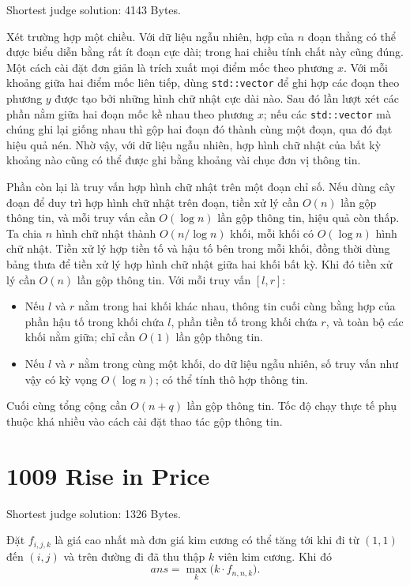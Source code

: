 \documentclass[11pt]{article}
\begin{document}
Shortest judge solution: 4143 Bytes.

Xét trường hợp một chiều. Với dữ liệu ngẫu nhiên, hợp của $n$ đoạn thẳng có
thể được biểu diễn bằng rất ít đoạn cực dài; trong hai chiều tính chất này
cũng đúng. Một cách cài đặt đơn giản là trích xuất mọi điểm mốc theo phương
$x$. Với mỗi khoảng giữa hai điểm mốc liên tiếp, dùng \texttt{std::vector}
để ghi hợp các đoạn theo phương $y$ được tạo bởi những hình chữ nhật cực dài
nào. Sau đó lần lượt xét các phần nằm giữa hai đoạn mốc kề nhau theo phương
$x$; nếu các \texttt{std::vector} mà chúng ghi lại giống nhau thì gộp hai
đoạn đó thành cùng một đoạn, qua đó đạt hiệu quả nén. Nhờ vậy, với dữ liệu
ngẫu nhiên, hợp hình chữ nhật của bất kỳ khoảng nào cũng có thể được ghi bằng
khoảng vài chục đơn vị thông tin.

Phần còn lại là truy vấn hợp hình chữ nhật trên một đoạn chỉ số. Nếu dùng cây
đoạn để duy trì hợp hình chữ nhật trên đoạn, tiền xử lý cần $O(n)$ lần gộp
thông tin, và mỗi truy vấn cần $O(\log n)$ lần gộp thông tin, hiệu quả còn
thấp. Ta chia $n$ hình chữ nhật thành $O(n/\log n)$ khối, mỗi khối có
$O(\log n)$ hình chữ nhật. Tiền xử lý hợp tiền tố và hậu tố bên trong mỗi
khối, đồng thời dùng bảng thưa để tiền xử lý hợp hình chữ nhật giữa hai khối
bất kỳ. Khi đó tiền xử lý cần $O(n)$ lần gộp thông tin. Với mỗi truy vấn
$[l,r]$:

\begin{itemize}
  \item Nếu $l$ và $r$ nằm trong hai khối khác nhau, thông tin cuối cùng bằng
  hợp của phần hậu tố trong khối chứa $l$, phần tiền tố trong khối chứa $r$,
  và toàn bộ các khối nằm giữa; chỉ cần $O(1)$ lần gộp thông tin.
  \item Nếu $l$ và $r$ nằm trong cùng một khối, do dữ liệu ngẫu nhiên, số
  truy vấn như vậy có kỳ vọng $O(\log n)$; có thể tính thô hợp thông tin.
\end{itemize}

Cuối cùng tổng cộng cần $O(n+q)$ lần gộp thông tin. Tốc độ chạy thực tế phụ
thuộc khá nhiều vào cách cài đặt thao tác gộp thông tin.

\section{1009 Rise in Price}

Shortest judge solution: 1326 Bytes.

Đặt $f_{i,j,k}$ là giá cao nhất mà đơn giá kim cương có thể tăng tới khi đi
từ $(1,1)$ đến $(i,j)$ và trên đường đi đã thu thập $k$ viên kim cương. Khi
đó
\[
  \mathit{ans}=\max_k\bigl(k\cdot f_{n,n,k}\bigr).
\]
\end{document}
